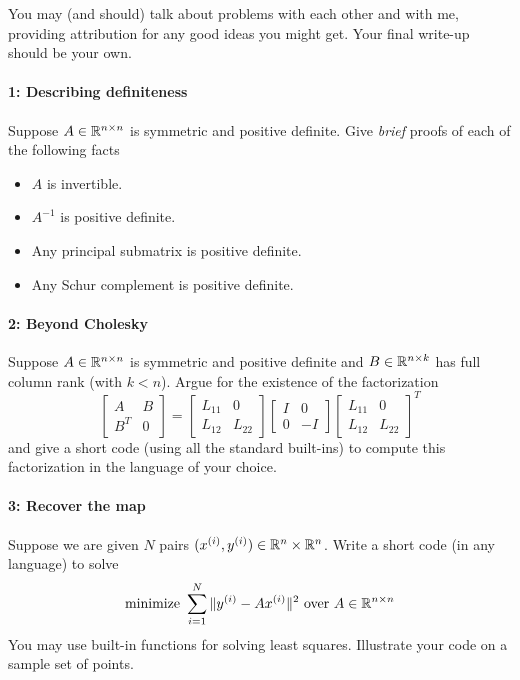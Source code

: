 \documentclass[12pt, leqno]{article} %
\begin{document}

You may (and should) talk about problems with each other and with me,
providing attribution for any good ideas you might get.  Your final
write-up should be your own.



\paragraph*{1: Describing definiteness}
Suppose $A \in \mathbb{R}^{n \times n}$ is symmetric and positive definite.
Give {\em brief} proofs of each of the following facts
\begin{itemize}
\item $A$ is invertible.
\item $A^{-1}$ is positive definite.
\item Any principal submatrix is positive definite.
\item Any Schur complement is positive definite.
\end{itemize}

\paragraph*{2: Beyond Cholesky}
Suppose $A \in \mathbb{R}^{n \times n}$ is symmetric and positive definite
and $B \in \mathbb{R}^{n \times k}$ has full column rank (with $k < n$).
Argue for the existence of the factorization
\[
  \begin{bmatrix} A & B \\ B^T & 0 \end{bmatrix} =
  \begin{bmatrix} L_{11} & 0 \\ L_{12} & L_{22} \end{bmatrix}
  \begin{bmatrix} I & 0 \\ 0 & -I \end{bmatrix}
  \begin{bmatrix} L_{11} & 0 \\ L_{12} & L_{22} \end{bmatrix}^T
\]
and give a short code (using all the standard built-ins) to
compute this factorization in the language of your choice.

\paragraph*{3: Recover the map}
Suppose we are given $N$ pairs
$(x^{(i)}, y^{(i)}) \in \mathbb{R}^n \times \mathbb{R}^n$.  Write a short
code (in any language) to solve
\[
  \mbox{minimize } \sum_{i=1}^N \|y^{(i)}-Ax^{(i)}\|^2
  \mbox{ over } A \in \mathbb{R}^{n \times n}
\]
You may use built-in functions for solving least squares.
Illustrate your code on a sample set of points.
\end{document}
